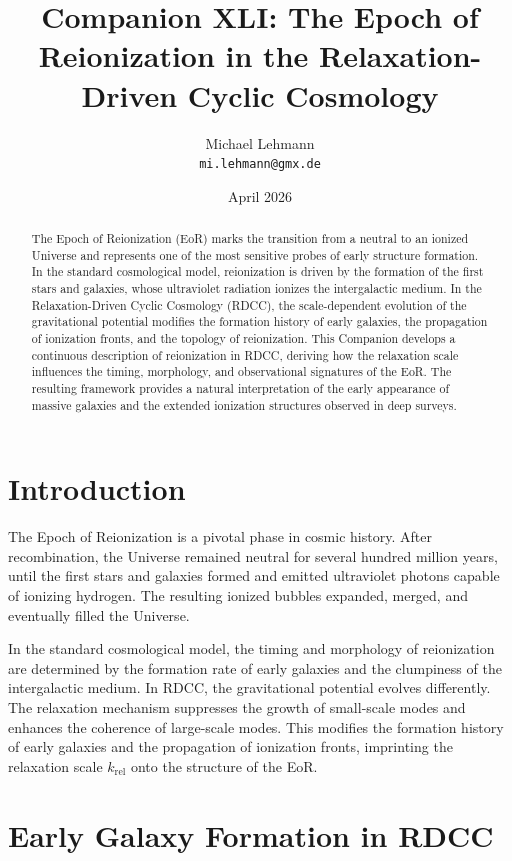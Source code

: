 \documentclass[11pt,a4paper]{article}
\title{\textbf{Companion XLI: The Epoch of Reionization in the Relaxation-Driven Cyclic Cosmology}}
\author{Michael Lehmann \\ \texttt{mi.lehmann@gmx.de}}
\date{April 2026}
\begin{document}
\maketitle

\begin{abstract}
The Epoch of Reionization (EoR) marks the transition from a neutral to an ionized 
Universe and represents one of the most sensitive probes of early structure 
formation. In the standard cosmological model, reionization is driven by the 
formation of the first stars and galaxies, whose ultraviolet radiation ionizes the 
intergalactic medium. In the Relaxation-Driven Cyclic Cosmology (RDCC), the 
scale-dependent evolution of the gravitational potential modifies the formation 
history of early galaxies, the propagation of ionization fronts, and the topology 
of reionization. This Companion develops a continuous description of reionization 
in RDCC, deriving how the relaxation scale influences the timing, morphology, and 
observational signatures of the EoR. The resulting framework provides a natural 
interpretation of the early appearance of massive galaxies and the extended 
ionization structures observed in deep surveys.
\end{abstract}
\section{Introduction}

The Epoch of Reionization is a pivotal phase in cosmic history. After recombination, 
the Universe remained neutral for several hundred million years, until the first 
stars and galaxies formed and emitted ultraviolet photons capable of ionizing 
hydrogen. The resulting ionized bubbles expanded, merged, and eventually filled the 
Universe.

In the standard cosmological model, the timing and morphology of reionization are 
determined by the formation rate of early galaxies and the clumpiness of the 
intergalactic medium. In RDCC, the gravitational potential evolves differently. The 
relaxation mechanism suppresses the growth of small-scale modes and enhances the 
coherence of large-scale modes. This modifies the formation history of early 
galaxies and the propagation of ionization fronts, imprinting the relaxation scale 
$k_{\mathrm{rel}}$ onto the structure of the EoR.
\section{Early Galaxy Formation in RDCC}
\end{document}
